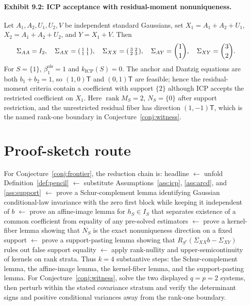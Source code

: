 \documentclass[11pt]{article}
\newcommand{\transpose}{\mathsf{T}}
\theoremstyle{definition}
\theoremstyle{plain}
\theoremstyle{remark}
\begin{document}
\paragraph{Exhibit 9.2: ICP acceptance with residual-moment nonuniqueness.}
Let $A_1,A_2,U_1,U_2,V$ be independent standard Gaussians, set $X_1=A_1+A_2+U_1$, $X_2=A_1+A_2+U_2$, and $Y=X_1+V$. Then
\[
\Sigma_{AA}=I_2,\quad
\Sigma_{AX}=\begin{psmallmatrix}1&1\\1&1\end{psmallmatrix},\quad
\Sigma_{XX}=\begin{psmallmatrix}3&2\\2&3\end{psmallmatrix},\quad
\Sigma_{AY}=\binom{1}{1},\quad
\Sigma_{XY}=\binom{3}{2}.
\]
For $S=\{1\}$, $\beta_1^{\mathrm{ols}}=1$ and $k_{\mathrm{ICP}}(S)=0$. The anchor and Dantzig equations are both $b_1+b_2=1$, so $(1,0)\transpose$ and $(0,1)\transpose$ are feasible; hence the residual-moment criteria contain a coefficient with support $\{2\}$ although ICP accepts the restricted coefficient on $X_1$. Here $\operatorname{rank}M_S=2$, $N_S=\{0\}$ after support restriction, and the unrestricted residual fiber has direction $(1,-1)\transpose$, which is the named rank-one boundary in Conjecture~\ref{conj:witness}.

\section{Proof-sketch route}
For Conjecture~\ref{conj:frontier}, the reduction chain is: headline $\leftarrow$ unfold Definition~\ref{def:pencil} $\leftarrow$ substitute Assumptions~\ref{ass:icp}, \ref{ass:arcd}, and \ref{ass:support} $\leftarrow$ prove a Schur-complement lemma identifying Gaussian conditional-law invariance with the zero first block while keeping it independent of $b$ $\leftarrow$ prove an affine-image lemma for $h_S\in I_S$ that separates existence of a common coefficient from equality of any pre-solved estimators $\leftarrow$ prove a kernel-fiber lemma showing that $N_S$ is the exact nonuniqueness direction on a fixed support $\leftarrow$ prove a support-pasting lemma showing that $R_{S^c}(\Sigma_{XX}b-\Sigma_{XY})$ rules out false support equality $\leftarrow$ apply rank-nullity and upper-semicontinuity of kernels on rank strata. Thus $k=4$ substantive steps: the Schur-complement lemma, the affine-image lemma, the kernel-fiber lemma, and the support-pasting lemma. For Conjecture~\ref{conj:witness}, solve the two displayed $q=p=2$ systems, then perturb within the stated covariance stratum and verify the determinant signs and positive conditional variances away from the rank-one boundary.
\end{document}
